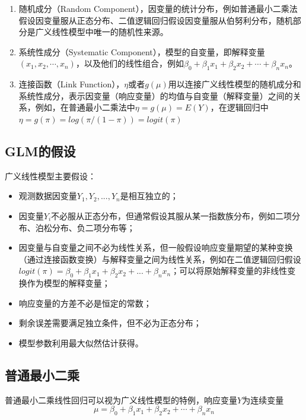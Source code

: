 \begin{enumerate}[itemsep=0pt,parsep=0pt]
    \item 随机成分（Random Component），因变量的统计分布，例如普通最小二乘法假设因变量服从正态分布、二值逻辑回归假设因变量服从伯努利分布，随机部分是广义线性模型中唯一的随机性来源。
    \item 系统性成分（Systematic Component），模型的自变量，即解释变量$(x_1,x_2,\cdots,x_n)$，以及他们的线性组合，例如$\beta_0 + \beta_1x_1 + \beta_2x_2 + \cdots + \beta_nx_n$。
    \item 连接函数（Link Function），$\eta$或者$g(\mu)$用以连接广义线性模型的随机成分和系统性成分，表示因变量（响应变量）的均值与自变量（解释变量）之间的关系，例如，在普通最小二乘法中$\eta =g(\mu)=E(Y)$，在逻辑回归中$\eta =g(\pi)=log(\pi/(1- \pi))=logit(\pi)$
\end{enumerate}

\subsection{GLM的假设}

广义线性模型主要假设：
\begin{itemize}[itemsep=0pt,parsep=0pt]
    \item 观测数据因变量$Y_1, Y_2, ..., Y_n$是相互独立的；
    \item 因变量$Y_i$不必服从正态分布，但通常假设其服从某一指数族分布，例如二项分布、泊松分布、负二项分布等；
    \item 因变量与自变量之间不必为线性关系，但一般假设响应变量期望的某种变换（通过连接函数变换）与解释变量之间为线性关系，例如在二值逻辑回归假设$logit(\pi)= \beta_0+ \beta_1x_1+ \beta_2x_2+...+ \beta_nx_n$；可以将原始解释变量的非线性变换作为模型的解释变量；
    \item 响应变量的方差不必是恒定的常数；
    \item 剩余误差需要满足独立条件，但不必为正态分布；
    \item 模型参数利用最大似然估计获得。
\end{itemize}

\subsection{普通最小二乘}

普通最小二乘线性回归可以视为广义线性模型的特例，响应变量$Y$为连续变量
\begin{equation}
    \mu = \beta_0 + \beta_1x_1 + \beta_2x_2 + \cdots + \beta_nx_n
\end{equation}

